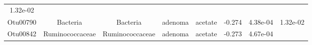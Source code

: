 \documentclass[11pt,]{article}
\begin{document}
\begin{longtable}[]{@{}cccccccc@{}}
\begin{minipage}[t]{0.08\columnwidth}
1.32e-02\strut
\end{minipage}\tabularnewline
\begin{minipage}[t]{0.08\columnwidth}\centering\strut
Otu00790\strut
\end{minipage} & \begin{minipage}[t]{0.15\columnwidth}\centering\strut
Bacteria\strut
\end{minipage} & \begin{minipage}[t]{0.15\columnwidth}\centering\strut
Bacteria\strut
\end{minipage} & \begin{minipage}[t]{0.08\columnwidth}\centering\strut
adenoma\strut
\end{minipage} & \begin{minipage}[t]{0.09\columnwidth}\centering\strut
acetate\strut
\end{minipage} & \begin{minipage}[t]{0.07\columnwidth}\centering\strut
-0.274\strut
\end{minipage} & \begin{minipage}[t]{0.08\columnwidth}\centering\strut
4.38e-04\strut
\end{minipage} & \begin{minipage}[t]{0.08\columnwidth}\centering\strut
1.32e-02\strut
\end{minipage}\tabularnewline
\begin{minipage}[t]{0.08\columnwidth}\centering\strut
Otu00842\strut
\end{minipage} & \begin{minipage}[t]{0.15\columnwidth}\centering\strut
Ruminococcaceae\strut
\end{minipage} & \begin{minipage}[t]{0.15\columnwidth}\centering\strut
Ruminococcaceae\strut
\end{minipage} & \begin{minipage}[t]{0.08\columnwidth}\centering\strut
adenoma\strut
\end{minipage} & \begin{minipage}[t]{0.09\columnwidth}\centering\strut
acetate\strut
\end{minipage} & \begin{minipage}[t]{0.07\columnwidth}\centering\strut
-0.273\strut
\end{minipage} & \begin{minipage}[t]{0.08\columnwidth}\centering\strut
4.67e-04\strut
\end{minipage} & \begin{minipage}[t]{0.08\columnwidth}\centering\strut

\end{minipage}
\end{longtable}
\end{document}
